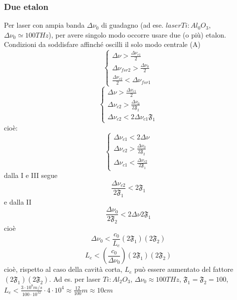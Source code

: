 \documentclass{book}
\def \D {\Delta}
\theoremstyle{remark}
\begin{document}
\subsubsection{Due etalon}
Per laser con ampia banda $\D\nu_0$ di guadagno (ad ese. $laser Ti:Al_0O_3$, $\D\nu_0 \simeq 100 THz$), per avere singolo modo occorre usare due (o più) etalon.
Condizioni da soddisfare affinché oscilli il solo modo centrale (A)
\begin{equation*}
\begin{cases}
\D\nu > \frac{\D\nu_{c1}}{2}\\
\D\nu_{fsr2} > \frac{\D \nu_0}{2}\\
\frac{\D \nu_{c2}}{2} < \D \nu_{fsr1}
\end{cases}
\end{equation*}
\begin{equation*}
\begin{cases}
\D\nu > \frac{\D\nu_{c1}}{2}\\
\D\nu_{c2} > \frac{\D \nu_0}{2\mathfrak{F}_2}\\
\D \nu_{c2} < 2\D \nu_{c1} \mathfrak{F}_1
\end{cases}
\end{equation*}
cioè:
\begin{equation*}
\begin{cases}
\D\nu_{c1} < 2\D\nu\\
\D\nu_{c2} > \frac{\D \nu_0}{2\mathfrak{F}_2}\\
\D \nu_{c1} < \frac{\D \nu_{c2}}{2\mathfrak{F}_1}
\end{cases}
\end{equation*}
dalla I e III segue
\begin{equation*}
\frac{\D\nu_{c2}}{2\mathfrak{F}_1} < 2\mathfrak{F_1}
\end{equation*}
e dalla II
\begin{equation*}
\frac{\D \nu_0}{2\mathfrak{F}_2} < 2 \D \nu 2 \mathfrak{F}_1
\end{equation*}
cioè
\begin{equation*}
\D \nu_0 < \frac{c_0}{L_e} (2\mathfrak{F}_1)(2\mathfrak{F}_2)
\end{equation*}
\begin{equation*}
L_e < \left(\frac{c_0}{\D\nu_0}\right) (2\mathfrak{F}_1)(2\mathfrak{F}_2)
\end{equation*}
cioè, rispetto al caso della cavità corta, $L_e$ può essere aumentato del fattore $(2\mathfrak{F}_1)(2\mathfrak{F}_2)$. Ad es. per laser $Ti:Al_2O_3$,
$\D\nu_0 \approx 100THz$, $\mathfrak{F}_1 = \mathfrak{F}_2 = 100$, $L_e < \frac{3\cdot 10^8 m/s}{100\cdot10^{12}} \cdot 4\cdot10^4 \approx \frac{12}{100}m \approx 10 cm$
\end{document}
